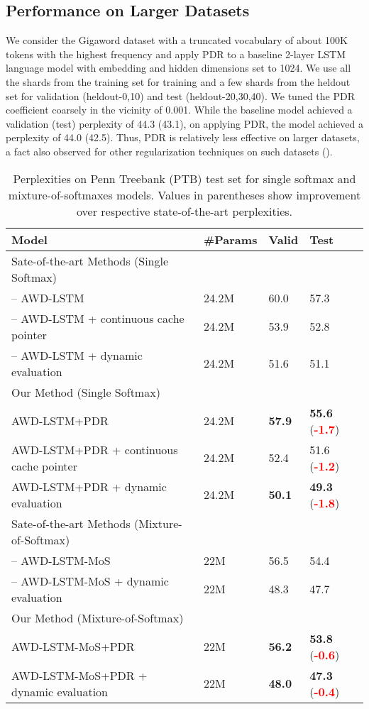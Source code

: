 \documentclass{article} \usepackage{iclr2019_conference,times}
\begin{document}
\subsection{Performance on Larger Datasets}
We consider the Gigaword dataset \cite{Chelba2014OneBW} with a  truncated vocabulary of about 100K tokens with the highest frequency and apply PDR to a baseline 2-layer LSTM language model with embedding and hidden dimensions set to 1024. We use all the shards from the training set for training and a few shards  from the heldout set for validation (heldout-0,10) and test (heldout-20,30,40). We tuned the PDR coefficient coarsely in the vicinity of 0.001. While the baseline model achieved a validation (test) perplexity of 44.3 (43.1), on applying PDR, the model achieved a perplexity of 44.0 (42.5).  Thus, PDR is relatively less effective on larger datasets, a fact also observed for other regularization techniques on such datasets (\cite{Yang2017BreakingTS}).



\begin{table}[t]
\begin{tabular}{llll}
\toprule
\textbf{Model} & \textbf{\#Params} & \textbf{Valid} & \textbf{Test} \\
\midrule
Sate-of-the-art Methods (Single Softmax)\\
\midrule
\cite{Merity2018} -- AWD-LSTM  & 24.2M &  60.0  & 57.3 \\
\cite{Merity2018} -- AWD-LSTM + continuous cache pointer & 24.2M &  53.9 & 52.8\\
\cite{Krause2018DynamicEO} -- AWD-LSTM + dynamic evaluation & 24.2M & 51.6 & 51.1 \\
\midrule
Our Method (Single Softmax)\\
\midrule
AWD-LSTM+PDR  & 24.2M & \textbf{57.9} & \textbf{55.6}  (\textcolor{red}{\textbf{-1.7}})\\
AWD-LSTM+PDR + continuous cache pointer & 24.2M & 52.4 & 51.6  (\textcolor{red}{\textbf{-1.2}}) \\
AWD-LSTM+PDR + dynamic evaluation & 24.2M & \textbf{50.1} & \textbf{49.3}  (\textcolor{red}{\textbf{-1.8}})\\
\midrule
Sate-of-the-art Methods (Mixture-of-Softmax)\\
\midrule
\cite{Yang2017BreakingTS} -- AWD-LSTM-MoS  & 22M &  56.5  & 54.4 \\
\cite{Yang2017BreakingTS} -- AWD-LSTM-MoS + dynamic evaluation & 22M &  48.3 & 47.7\\
\midrule
Our Method (Mixture-of-Softmax)\\
\midrule
AWD-LSTM-MoS+PDR  & 22M & \textbf{56.2} & \textbf{53.8}  (\textcolor{red}{\textbf{-0.6}})\\
AWD-LSTM-MoS+PDR + dynamic evaluation & 22M & \textbf{48.0} & \textbf{47.3}  (\textcolor{red}{\textbf{-0.4}})\\
\toprule
\end{tabular}
\caption{Perplexities on Penn Treebank (PTB) test set for single softmax and mixture-of-softmaxes models. Values in parentheses show improvement over respective  state-of-the-art perplexities. }
\label{tab:ptb_res}
\end{table}
\end{document}
